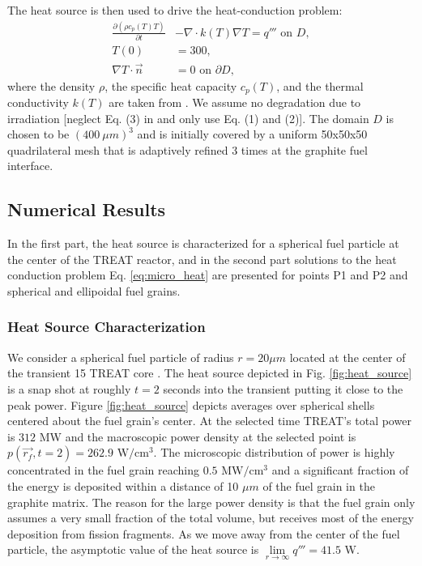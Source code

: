\documentclass{anstrans}
\begin{document}
The heat source is then used to drive the heat-conduction problem:
\begin{align}\label{eq:micro_heat}
   \frac{\partial (\rho c_p(T) T)}{\partial t}& - \nabla \cdot k(T) \nabla T = q''' \text{ on }D, \nonumber \\
    T(0) &= 300, \nonumber \\
     \nabla T \cdot \vec{n} &=0\text{ on } \partial D,
\end{align}
where the density $\rho$, the specific heat capacity $c_p(T)$, and the thermal conductivity $k(T)$ are taken from \cite{Mo2015}. We assume no degradation due to irradiation [neglect Eq. (3) in \cite{Mo2015} and only use Eq. (1) and (2)]. The domain $D$ is chosen to be $(400~\mu m)^3$ and is initially covered by a uniform 50x50x50 quadrilateral mesh that is adaptively refined 3 times at the graphite fuel interface.

\subsection{Numerical Results}
In the first part, the heat source is characterized for a spherical fuel particle at the center of the TREAT reactor, and in the second part solutions to the heat conduction problem Eq. \eqref{eq:micro_heat} are presented for points P1 and P2 and spherical and ellipoidal fuel grains.

\subsubsection{Heat Source Characterization}
We consider a spherical fuel particle of radius $r=20\mu m$ located at the center of the transient 15 TREAT core \cite{Ortensi2015}. The heat source depicted in Fig. \ref{fig:heat_source} is a snap shot at roughly $t=2$ seconds into the transient putting it close to the peak power. Figure \ref{fig:heat_source} depicts averages over spherical shells centered about the fuel grain's center.
At the selected time TREAT's total power is $312$ MW and the macroscopic power density at the selected point is $p(\vec{r_f}, t=2) = 262.9$ $\text{W}/ \text{cm}^3$. The microscopic distribution of power is highly concentrated in the fuel grain reaching $0.5$ $\text{MW}/ \text{cm}^3$ and a significant fraction of the energy is deposited within a distance of 10 $\mu m$ of the fuel grain in the graphite matrix. The reason for the large power density is that the fuel grain only assumes a very small fraction of the total volume, but receives most of the energy deposition from fission fragments. As we move away from the center of the fuel particle, the asymptotic value of the heat source is $\lim\limits_{r\rightarrow \infty} q''' = 41.5$ W.
\end{document}
